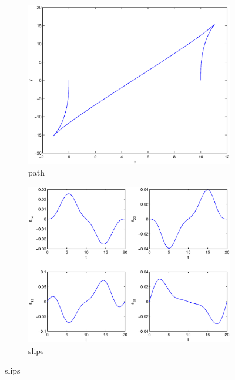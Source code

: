 \begin{figure}
\begin{subfigure}[b]{\textwidth}
\centering
\includegraphics[height=0.3\textheight]{img/final_15_15_20_path.eps}
\caption{path}
\end{subfigure}

\begin{subfigure}[b]{\textwidth}
\centering
\includegraphics[height=0.3\textheight]{img/final_15_15_20_slips.eps}
\caption{slips}
\end{subfigure}


\end{figure}
